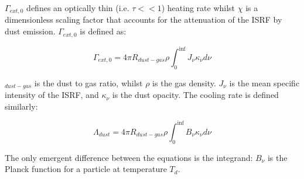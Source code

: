 \documentclass{report}
\begin{document}
$\Gamma_{ext,0}$ defines an optically thin (i.e. $\tau<<1$) heating rate whilst $\chi$ is a dimensionless scaling factor that accounts for the attenuation of the ISRF by dust emission. $\Gamma_{ext,0}$ is defined as:

\begin{equation}
  \Gamma_{ext,0} = 4\pi R_{dust-gas} \rho \int_{0}^{\inf} J_{\nu} \kappa_{\nu} d\nu
\end{equation}

$_{dust-gas}$ is the dust to gas ratio, whilst $\rho$ is the gas density. $J_{\nu}$ is the mean specific intensity of the ISRF, and $\kappa_{\nu}$ is the dust opacity. The cooling rate is defined similarly:

\begin{equation}
  \Lambda_{dust} = 4\pi R_{dust-gas} \rho \int_{0}^{\inf} B_{\nu} \kappa_{\nu} d\nu
\end{equation}

The only emergent difference between the equations is the integrand: $B_{\nu}$ is the Planck function for a particle at temperature $T_{d}$.


\printbibliography


\end{document}
